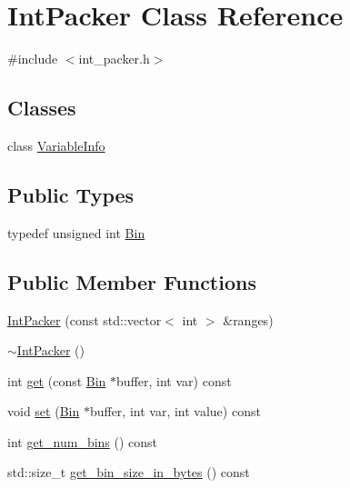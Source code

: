 \hypertarget{classIntPacker}{\section{Int\-Packer Class Reference}
\label{classIntPacker}
}


{\ttfamily \#include $<$int\-\_\-packer.\-h$>$}

\subsection*{Classes}
\begin{DoxyCompactItemize}
\item 
class \hyperlink{classIntPacker_1_1VariableInfo}{Variable\-Info}
\end{DoxyCompactItemize}
\subsection*{Public Types}
\begin{DoxyCompactItemize}
\item 
typedef unsigned int \hyperlink{classIntPacker_aaba4fb76f4a256591346d2a8b4119b0f}{Bin}
\end{DoxyCompactItemize}
\subsection*{Public Member Functions}
\begin{DoxyCompactItemize}
\item 
\hyperlink{classIntPacker_a98b0b63275e08411ed758432a987c5fa}{Int\-Packer} (const std\-::vector$<$ int $>$ \&ranges)
\item 
\hyperlink{classIntPacker_a3dcc8e37c7b4850700c1fa626ed78fb4}{$\sim$\-Int\-Packer} ()
\item 
int \hyperlink{classIntPacker_ab8a207a1f2fea76a796bf85ff2236297}{get} (const \hyperlink{classIntPacker_aaba4fb76f4a256591346d2a8b4119b0f}{Bin} $\ast$buffer, int var) const 
\item 
void \hyperlink{classIntPacker_a12f8374a73cad207e16d5ee969a9da13}{set} (\hyperlink{classIntPacker_aaba4fb76f4a256591346d2a8b4119b0f}{Bin} $\ast$buffer, int var, int value) const 
\item 
int \hyperlink{classIntPacker_a09cea124402536a933145360f33b0891}{get\-\_\-num\-\_\-bins} () const 
\item 
std\-::size\-\_\-t \hyperlink{classIntPacker_a3dfc4981dd2c445128c5d76222f107a7}{get\-\_\-bin\-\_\-size\-\_\-in\-\_\-bytes} () const 
\end{DoxyCompactItemize}



